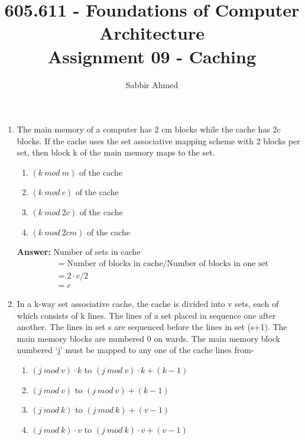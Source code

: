 \documentclass[12pt]{article}
\newcommand{\answeritem}{\global\answertrue\item}
\newcommand{\perhapsanswer}{%
  \ifanswer
    $\blacksquare$ \global\answerfalse
  \else
    $\square$ \global\answerfalse
  \fi
}
\newif\ifanswer
\begin{document}
  \title{605.611 - Foundations of Computer Architecture \\ Assignment 09 - Caching\vspace{-0.5em}}
  \author{Sabbir Ahmed}
  \maketitle
  \vspace{-1em}

  \begin{enumerate}

  \item The main memory of a computer has 2 cm blocks while the cache has 2c blocks. If the cache uses the set associative mapping scheme with 2 blocks per set, then block k of the main memory maps to the set.

  \begin{enumerate}[start=1,align=left,label={\protect\perhapsanswer(\alph*)}]
    \item $(k \ mod \ m)$ of the cache
    \answeritem $(k \ mod \ c)$ of the cache
    \item $(k \ mod \ 2 c)$ of the cache
    \item $(k \ mod \ 2 cm)$ of the cache
  \end{enumerate}

  \textbf{Answer:}
  Number of sets in cache
  \begin{align*}
    &= \text{Number of blocks in cache} / \text{Number of blocks in one set} \\
    &= 2 \cdot c / 2 \\
    &= c
  \end{align*}

  \item In a k-way set associative cache, the cache is divided into v sets, each of which consists of k lines. The lines of a set placed in sequence one after another. The lines in set s are sequenced before the lines in set (s+1). The main memory blocks are numbered 0 on wards. The main memory block numbered ‘j’ must be mapped to any one of the cache lines from-

  \begin{enumerate}[start=1,align=left,label={\protect\perhapsanswer(\alph*)}]
    \answeritem $(j \ mod \ v) \cdot k$ to $(j \ mod \ v) \cdot k + (k - 1)$
    \item $(j \ mod \ v)$ to $(j \ mod \ v) + (k - 1)$
    \item $(j \ mod \ k)$ to $(j \ mod \ k) + (v - 1)$
    \item $(j \ mod \ k) \cdot v$ to $(j \ mod \ k) \cdot v + (v - 1)$
  \end{enumerate}


\end{enumerate}
\end{document}
